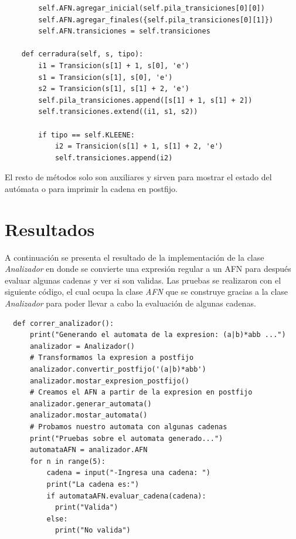 \documentclass[titlepage]{article}
\begin{document}
\begin{lstlisting}
		self.AFN.agregar_inicial(self.pila_transiciones[0][0])
		self.AFN.agregar_finales({self.pila_transiciones[0][1]})
		self.AFN.transiciones = self.transiciones
	
	def cerradura(self, s, tipo):
		i1 = Transicion(s[1] + 1, s[0], 'e')
		s1 = Transicion(s[1], s[0], 'e')
		s2 = Transicion(s[1], s[1] + 2, 'e')
		self.pila_transiciones.append([s[1] + 1, s[1] + 2])
		self.transiciones.extend((i1, s1, s2))
	
		if tipo == self.KLEENE:
			i2 = Transicion(s[1] + 1, s[1] + 2, 'e')
			self.transiciones.append(i2)
  \end{lstlisting}
  
  El resto de métodos solo son auxiliares y sirven para mostrar el estado del autómata o para imprimir la cadena en postfijo. 
  
  \section{Resultados}
  A continuación se presenta el resultado de la implementación de la clase \emph{Analizador} en donde se convierte una expresión regular 
  a un AFN para después evaluar algunas cadenas y ver si son validas. Las pruebas se realizaron con el siguiente código, el cual ocupa la clase 
  \emph{AFN} que se construye gracias a la clase \emph{Analizador} para poder llevar a cabo la evaluación de algunas cadenas.
  
  \begin{lstlisting}
  def correr_analizador():
	  print("Generando el automata de la expresion: (a|b)*abb ...")
	  analizador = Analizador()
	  # Transformamos la expresion a postfijo
	  analizador.convertir_postfijo('(a|b)*abb')
	  analizador.mostar_expresion_postfijo()
	  # Creamos el AFN a partir de la expresion en postfijo
	  analizador.generar_automata()
	  analizador.mostar_automata()
	  # Probamos nuestro automata con algunas cadenas
	  print("Pruebas sobre el automata generado...")
	  automataAFN = analizador.AFN
	  for n in range(5):
		  cadena = input("-Ingresa una cadena: ")
		  print("La cadena es:")
		  if automataAFN.evaluar_cadena(cadena):
		  	print("Valida")
		  else:
		  	print("No valida")
  \end{lstlisting}
  
\end{document}
